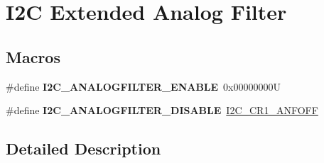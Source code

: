 \hypertarget{group___i2_c_ex___analog___filter}{}\section{I2C Extended Analog Filter}
\label{group___i2_c_ex___analog___filter}
\subsection*{Macros}
\begin{DoxyCompactItemize}
\item 
\mbox{\label{group___i2_c_ex___analog___filter_gae13bf4e7efd918ab0d13d04472d12069}} 
\#define {\bfseries I2\+C\+\_\+\+A\+N\+A\+L\+O\+G\+F\+I\+L\+T\+E\+R\+\_\+\+E\+N\+A\+B\+LE}~0x00000000U
\item 
\mbox{\label{group___i2_c_ex___analog___filter_gaa6abec6bc8906cae55371c8e953353b8}} 
\#define {\bfseries I2\+C\+\_\+\+A\+N\+A\+L\+O\+G\+F\+I\+L\+T\+E\+R\+\_\+\+D\+I\+S\+A\+B\+LE}~\mbox{\hyperlink{group___peripheral___registers___bits___definition_ga4b33b8e33fa18fd49d6d1d8a69777289}{I2\+C\+\_\+\+C\+R1\+\_\+\+A\+N\+F\+O\+FF}}
\end{DoxyCompactItemize}


\subsection{Detailed Description}
